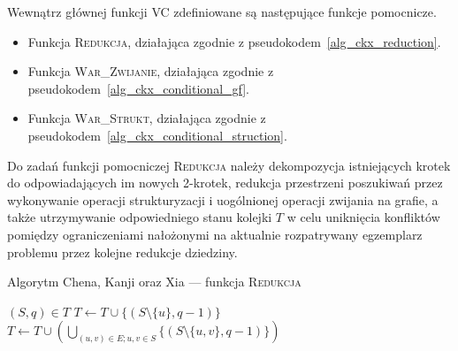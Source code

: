 {  Wewnątrz głównej funkcji \textsc{VC} zdefiniowane są następujące funkcje pomocnicze.
  \begin{itemize}
    \item Funkcja \textsc{Redukcja}, działająca zgodnie z pseudokodem~\ref{alg_ckx_reduction}.
    \item Funkcja \textsc{War\_Zwijanie}, działająca zgodnie z pseudokodem~\ref{alg_ckx_conditional_gf}.
    \item Funkcja \textsc{War\_Strukt}, działająca zgodnie z pseudokodem~\ref{alg_ckx_conditional_struction}.
  \end{itemize}

  Do zadań funkcji pomocniczej \textsc{Redukcja} należy dekompozycja istniejących krotek do odpowiadających im nowych 2-krotek, redukcja przestrzeni poszukiwań przez wykonywanie operacji strukturyzacji i uogólnionej operacji zwijania na grafie, a także utrzymywanie odpowiedniego stanu kolejki $T$ w celu uniknięcia konfliktów pomiędzy ograniczeniami nałożonymi na aktualnie rozpatrywany egzemplarz problemu przez kolejne redukcje dziedziny.

  \begin{algorithm}
   \caption{Algorytm Chena, Kanji oraz Xia --- funkcja \textsc{Redukcja}}\label{alg_ckx_reduction}
   \begin{algorithmic}[1]
      \ForAll$(S, q) \in T$
        \EndIf
          \State$T \gets T \cup \{(S \setminus \{u\}, q-1)\}$\label{a2}
        \EndFor
          \State$T \gets T \cup (\bigcup_{(u, v) \in E; u,v \in S}\{(S \setminus \{u, v\}, q-1)\})$\label{a3}
        \EndIf
        \label{a4}
        \EndIf
      \EndFor
      \label{b}
        \State{}
      \EndIf
      \EndIf
    \EndFunction
   \end{algorithmic}
  \end{algorithm}

}
